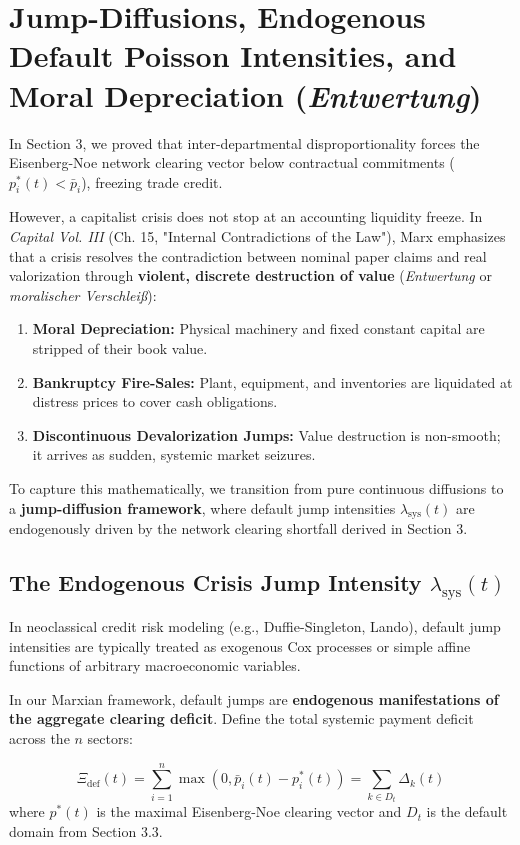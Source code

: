 \documentclass[11pt,letterpaper]{report}
\begin{document}
\section{Jump-Diffusions, Endogenous Default Poisson Intensities, and Moral Depreciation (\emph{Entwertung})}
In Section 3, we proved that inter-departmental disproportionality forces the Eisenberg-Noe network clearing vector below contractual commitments (${p}_{i}^{*}(t)<{\bar{p}}_{i}$), freezing trade credit.

However, a capitalist crisis does not stop at an accounting liquidity freeze. In \emph{Capital Vol. III} (Ch. 15, "Internal Contradictions of the Law"), Marx emphasizes that a crisis resolves the contradiction between nominal paper claims and real valorization through \textbf{violent, discrete destruction of value} (\emph{Entwertung} or \emph{moralischer Verschleiß}):

\begin{enumerate}
\item \textbf{Moral Depreciation:} Physical machinery and fixed constant capital are stripped of their book value.
\item \textbf{Bankruptcy Fire-Sales:} Plant, equipment, and inventories are liquidated at distress prices to cover cash obligations.
\item \textbf{Discontinuous Devalorization Jumps:} Value destruction is non-smooth; it arrives as sudden, systemic market seizures.
\end{enumerate}
To capture this mathematically, we transition from pure continuous diffusions to a \textbf{jump-diffusion framework}, where default jump intensities ${\lambda }_{\mathrm{sys}}(t)$ are endogenously driven by the network clearing shortfall derived in Section 3.

\subsection{The Endogenous Crisis Jump Intensity ${\lambda }_{\mathrm{sys}}(t)$}
In neoclassical credit risk modeling (e.g., Duffie-Singleton, Lando), default jump intensities are typically treated as exogenous Cox processes or simple affine functions of arbitrary macroeconomic variables.

In our Marxian framework, default jumps are \textbf{endogenous manifestations of the aggregate clearing deficit}. Define the total systemic payment deficit across the $n$ sectors:

\[
{\Xi }_{\mathrm{def}}(t)=\sum\limits_{i=1}^{n}\max\left({0,{\bar{p}}_{i}(t)-{p}_{i}^{*}(t)}\right)=\sum\limits_{k\in {D}_{t}}^{}{\Delta }_{k}(t)
\]
where ${p}^{*}(t)$ is the maximal Eisenberg-Noe clearing vector and ${D}_{t}$ is the default domain from Section 3.3.
\end{document}

